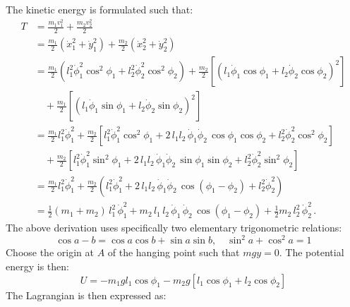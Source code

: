The kinetic energy is formulated such that: 
  \begin{align}
    T
    &= \frac{m_{1}v_{1}^{2}}{2} + \frac{m_{2}v_{2}^{2}}{2}\\
    &= \frac{m_{1}}{2} (\dot{x}^{2}_{1} + \dot{y}^{2}_{1}) + \frac{m_{2}}{2} (\dot{x}^{2}_{2} + \dot{y}^{2}_{2})\\
    &= \frac{m_{1}}{2} \left(l_{1}^{2}\dot{\phi}_{1}^{2}\cos^{2}\phi_{1} + l_{2}^{2}\dot{\phi}_{2}^{2}\cos^{2}\phi_{2}\right)
       + \frac{m_{2}}{2} \left[\left(l_{1}\dot{\phi}_{1}\cos\phi_{1} + l_{2}\dot{\phi}_{2}\cos\phi_{2}\right)^{2}\right]\\
       & \quad+ \frac{m_{1}}{2}\left[\left(l_{1}\dot{\phi}_{1}\sin\phi_{1} + l_{2}\dot{\phi}_{2}\sin\phi_{2}\right)^{2}\right]\\
    &= \frac{m_{1}}{2} l_{1}^{2} \dot{\phi}_{1}^{2}
       + \frac{m_{2}}{2}\left[
         l_{1}^{2} \dot{\phi}_{1}^{2}\cos^{2}\phi_{1}
         + 2\,l_{1}l_{2}\,\dot{\phi}_{1}\dot{\phi}_{2}\,\cos\phi_{1}\cos\phi_{2}
         + l_{2}^{2} \dot{\phi}_{2}^{2}\cos^{2}\phi_{2}
       \right]\\
    &\quad + \frac{m_{2}}{2}\left[
         l_{1}^{2} \dot{\phi}_{1}^{2}\sin^{2}\phi_{1}
         + 2\,l_{1}l_{2}\,\dot{\phi}_{1}\dot{\phi}_{2}\,\sin\phi_{1}\sin\phi_{2}
         + l_{2}^{2} \dot{\phi}_{2}^{2}\sin^{2}\phi_{2}
       \right]\\[6pt]
    &= \frac{m_{1}}{2} l_{1}^{2} \dot{\phi}_{1}^{2}
       + \frac{m_{2}}{2}\left(
         l_{1}^{2}\dot{\phi}_{1}^{2}
         + 2\,l_{1}l_{2}\,\dot{\phi}_{1}\dot{\phi}_{2}\,\cos(\phi_{1}-\phi_{2})
         + l_{2}^{2}\dot{\phi}_{2}^{2}
       \right)\\[6pt]
    &= \frac{1}{2}(m_{1} + m_{2})\,l_{1}^{2}\,\dot{\phi}_{1}^{2}
       + m_{2}\,l_{1}\,l_{2}\,\dot{\phi}_{1}\,\dot{\phi}_{2}\,\cos(\phi_{1}-\phi_{2})
       + \frac{1}{2}m_{2}\,l_{2}^{2}\,\dot{\phi}_{2}^{2}\,.
  \end{align}
The above derivation uses specifically two elementary trigonometric relations:
\begin{equation}
    \cos{a-b} = \cos{a}\cos{b} + \sin{a}\sin{b}, \quad \sin^{2}{a} + \cos^{2}{a} =1 
\end{equation}
Choose the origin at $A$ of the hanging point such that $mgy=0$. The potential energy is then: 
\begin{equation}
    U = - m_{1}gl_{1} \cos{\phi_{1}} - m_{2} g[l_{1}\cos{\phi_{1}}+ l_{2}\cos{\phi_{2}}] 
\end{equation}
The Lagrangian is then expressed as: 

